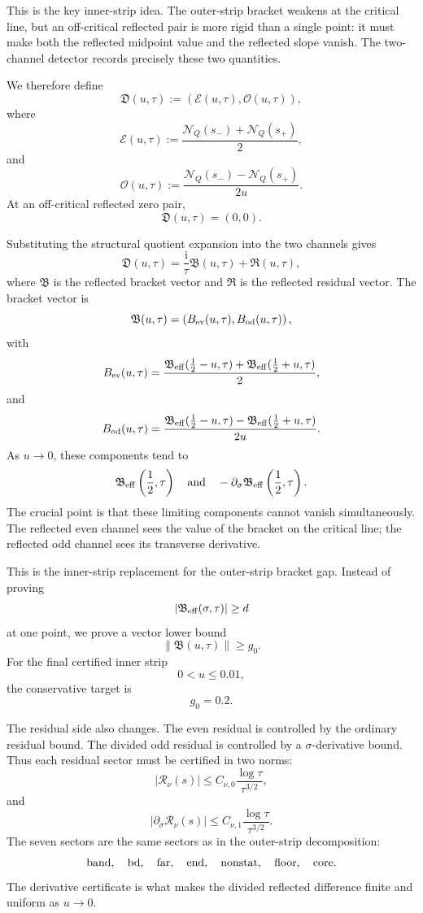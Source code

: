 \documentclass[11pt]{article}
\newcommand{\ii}{\mathrm{i}}
\newcommand{\NQ}{\mathcal N_Q}
\newcommand{\Beff}{\mathfrak B_{\rm eff}}
\newcommand{\Ech}{\mathcal E}
\newcommand{\Och}{\mathcal O}
\newcommand{\Dvec}{\mathfrak D}
\newcommand{\Bvec}{\mathfrak B}
\newcommand{\Rvec}{\mathfrak R}
\newcommand{\gev}{g_0}
\begin{document}
This is the key inner-strip idea.  The outer-strip bracket weakens at the
critical line, but an off-critical reflected pair is more rigid than a single
point: it must make both the reflected midpoint value and the reflected slope
vanish.  The two-channel detector records precisely these two quantities.

We therefore define
\[
        \Dvec(u,\tau)
        :=
        \left(
        \Ech(u,\tau),
        \Och(u,\tau)
        \right),
\]
where
\[
        \Ech(u,\tau)
        :=
        \frac{\NQ(s_-)+\NQ(s_+)}2,
\]
and
\[
        \Och(u,\tau)
        :=
        \frac{\NQ(s_-)-\NQ(s_+)}{2u}.
\]
At an off-critical reflected zero pair,
\[
        \Dvec(u,\tau)=(0,0).
\]

Substituting the structural quotient expansion into the two channels gives
\[
        \Dvec(u,\tau)
        =
        \frac{\ii}{\tau}\Bvec(u,\tau)
        +
        \Rvec(u,\tau),
\]
where \(\Bvec\) is the reflected bracket vector and \(\Rvec\) is the reflected
residual vector.  The bracket vector is
\[
        \Bvec(u,\tau)
        =
        \left(
        B_{\rm ev}(u,\tau),
        B_{\rm od}(u,\tau)
        \right),
\]
with
\[
        B_{\rm ev}(u,\tau)
        =
        \frac{
        \Beff(\frac12-u,\tau)
        +
        \Beff(\frac12+u,\tau)
        }2,
\]
and
\[
        B_{\rm od}(u,\tau)
        =
        \frac{
        \Beff(\frac12-u,\tau)
        -
        \Beff(\frac12+u,\tau)
        }{2u}.
\]
As \(u\to0\), these components tend to
\[
        \Beff\left(\frac12,\tau\right)
        \quad\text{and}\quad
        -\partial_\sigma\Beff\left(\frac12,\tau\right).
\]
The crucial point is that these limiting components cannot vanish
simultaneously.  The reflected even channel sees the value of the bracket on
the critical line; the reflected odd channel sees its transverse derivative.

This is the inner-strip replacement for the outer-strip bracket gap.  Instead
of proving
\[
        |\Beff(\sigma,\tau)|\ge d
\]
at one point, we prove a vector lower bound
\[
        \|\Bvec(u,\tau)\|\ge \gev.
\]
For the final certified inner strip
\[
        0<u\le0.01,
\]
the conservative target is
\[
        \gev=0.2.
\]

The residual side also changes.  The even residual is controlled by the
ordinary residual bound.  The divided odd residual is controlled by a
\(\sigma\)-derivative bound.  Thus each residual sector must be certified in
two norms:
\[
        |\mathcal R_\nu(s)|
        \le
        C_{\nu,0}
        \frac{\log\tau}{\tau^{3/2}},
\]
and
\[
        |\partial_\sigma\mathcal R_\nu(s)|
        \le
        C_{\nu,1}
        \frac{\log\tau}{\tau^{3/2}}.
\]
The seven sectors are the same sectors as in the outer-strip decomposition:
\[
        {\rm band},
        \quad
        {\rm bd},
        \quad
        {\rm far},
        \quad
        {\rm end},
        \quad
        {\rm nonstat},
        \quad
        {\rm floor},
        \quad
        {\rm core}.
\]
The derivative certificate is what makes the divided reflected difference
finite and uniform as \(u\to0\).
\end{document}

